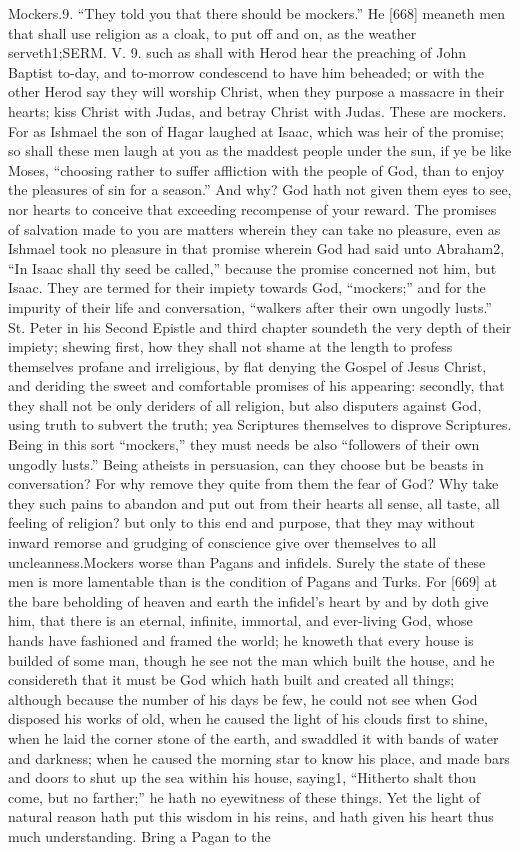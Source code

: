 Mockers.9. “They told you that there should be mockers.” He [668] meaneth men that shall use religion as a cloak, to put off and on, as the weather serveth1;SERM. V. 9. such as shall with Herod hear the preaching of John Baptist to-day, and to-morrow condescend to have him beheaded; or with the other Herod say they will worship Christ, when they purpose a massacre in their hearts; kiss Christ with Judas, and betray Christ with Judas. These are mockers. For as Ishmael the son of Hagar laughed at Isaac, which was heir of the promise; so shall these men laugh at you as the maddest people under the sun, if ye be like Moses, “choosing rather to suffer affliction with the people of God, than to enjoy the pleasures of sin for a season.” And why? God hath not given them eyes to see, nor hearts to conceive that exceeding recompense of your reward. The promises of salvation made to you are matters wherein they can take no pleasure, even as Ishmael took no pleasure in that promise wherein God had said unto Abraham2, “In Isaac shall thy seed be called,” because the promise concerned not him, but Isaac. They are termed for their impiety towards God, “mockers;” and for the impurity of their life and conversation, “walkers after their own ungodly lusts.” St. Peter in his Second Epistle and third chapter soundeth the very depth of their impiety; shewing first, how they shall not shame at the length to profess themselves profane and irreligious, by flat denying the Gospel of Jesus Christ, and deriding the sweet and comfortable promises of his appearing: secondly, that they shall not be only deriders of all religion, but also disputers against God, using truth to subvert the truth; yea Scriptures themselves to disprove Scriptures. Being in this sort “mockers,” they must needs be also “followers of their own ungodly lusts.” Being atheists in persuasion, can they choose but be beasts in conversation? For why remove they quite from them the fear of God? Why take they such pains to abandon and put out from their hearts all sense, all taste, all feeling of religion? but only to this end and purpose, that they may without inward remorse and grudging of conscience give over themselves to all uncleanness.Mockers worse than Pagans and infidels. Surely the state of these men is more lamentable than is the condition of Pagans and Turks. For [669] at the bare beholding of heaven and earth the infidel’s heart by and by doth give him, that there is an eternal, infinite, immortal, and ever-living God, whose hands have fashioned and framed the world; he knoweth that every house is builded of some man, though he see not the man which built the house, and he considereth that it must be God which hath built and created all things; although because the number of his days be few, he could not see when God disposed his works of old, when he caused the light of his clouds first to shine, when he laid the corner stone of the earth, and swaddled it with bands of water and darkness; when he caused the morning star to know his place, and made bars and doors to shut up the sea within his house, saying1, “Hitherto shalt thou come, but no farther;” he hath no eyewitness of these things. Yet the light of natural reason hath put this wisdom in his reins, and hath given his heart thus much understanding. Bring a Pagan to the 